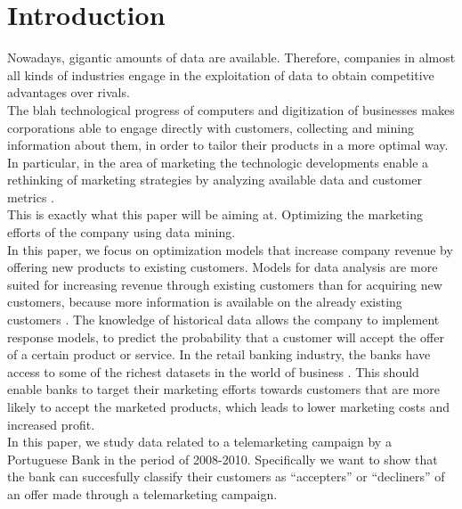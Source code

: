\pagestyle{empty} %

\titleGP %

    \newpage
    \pagestyle{fancy}
    \section{Introduction}
\noindent Nowadays, gigantic amounts of data are available. Therefore, companies in almost all kinds of industries engage in the exploitation of data to obtain competitive advantages over rivals\citep{provost2013data}.\\
The blah technological progress of computers and digitization of businesses makes corporations able to engage directly with customers, collecting and mining information about them, in order to tailor their products in a more optimal way\citep{rust2010rethinking}.\\ 
[\baselineskip]\indent
In particular, in the area of marketing the technologic developments enable a rethinking of marketing strategies by analyzing available data and customer metrics \citep{moro2014data}. \\
This is exactly what this paper will be aiming at. Optimizing the marketing efforts of the company using data mining.\\
In this paper, we focus on optimization models that increase company revenue by offering new products to existing customers. Models for data analysis are more suited for increasing revenue through existing customers than for acquiring new customers, because more information is available on the already existing customers \citep{nobibon2011optimization}. The knowledge of historical data allows the company to implement response models, to predict the probability that a customer will accept the offer of a certain product or service. In the retail banking industry, the banks have access to some of the richest datasets in the world of business \citep{nobibon2011optimization}. This should enable banks to target their marketing efforts towards customers that are more likely to accept the marketed products, which leads to lower marketing costs and increased profit.\\
In this paper, we study data related to a telemarketing campaign by a Portuguese Bank in the period of 2008-2010. Specifically we want to show that the bank can succesfully classify their customers as “accepters” or “decliners” of an offer made through a telemarketing campaign.\\
